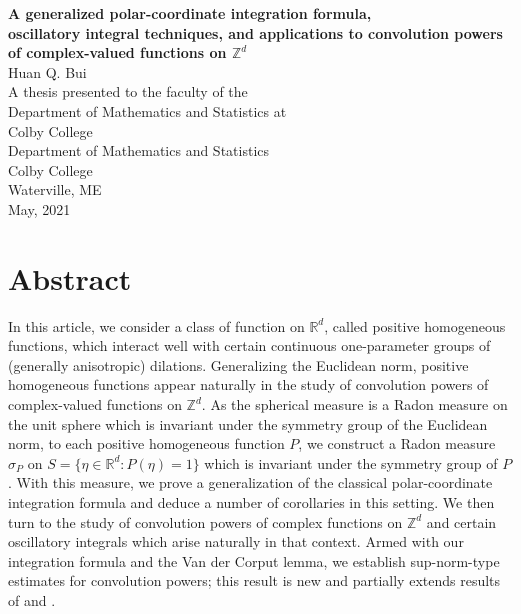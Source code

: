 \documentclass[11pt, letter]{book}
\begin{document}
\thispagestyle{empty}
\begin{center}
{\Large{\textbf{
A generalized polar-coordinate integration formula, \\
oscillatory integral techniques, and applications to convolution powers of complex-valued functions on $\mathbb{Z}^d$
}}}\\
\vspace{1cm}
{\large{Huan Q. Bui}}\\
\vspace{7cm}
A thesis presented to the faculty of the\\
Department of Mathematics and Statistics at\\
Colby College\\
\vspace{7cm}
Department of Mathematics and Statistics\\
Colby College\\
Waterville, ME\\
May, 2021
\end{center}


\newpage
\section*{Abstract} 


In this article, we consider a class of function on $\mathbb{R}^d$, called positive homogeneous functions, which interact well with certain continuous one-parameter groups of (generally anisotropic) dilations. Generalizing the Euclidean norm, positive homogeneous functions appear naturally in the study of convolution powers of complex-valued functions on $\mathbb{Z}^d$. As the spherical measure is a Radon measure on the unit sphere which is invariant under the symmetry group of the Euclidean norm, to each positive homogeneous function $P$, we construct a Radon measure $\sigma_P$ on $S=\{\eta \in \mathbb{R}^d:P(\eta)=1\}$ which is invariant under the symmetry group of $P$. With this measure, we prove a generalization of the classical polar-coordinate integration formula and deduce a number of corollaries in this setting. We then turn to the study of convolution powers of complex functions on $\mathbb{Z}^d$ and certain oscillatory integrals which arise naturally in that context. Armed with our integration formula and the Van der Corput lemma, we establish sup-norm-type estimates for convolution powers; this result is new and partially extends results of \cite{randles_convolution_2015} and \cite{randles_convolution_2017}.
\end{document}
